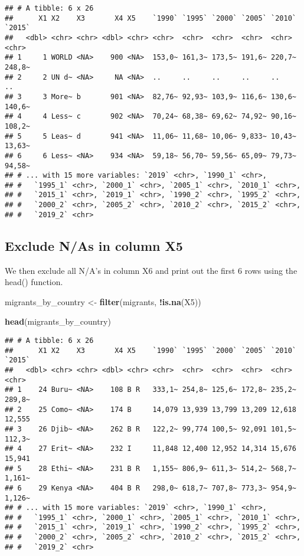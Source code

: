 \documentclass[]{article}
\newenvironment{Shaded}{\begin{snugshade}}{\end{snugshade}}
\newcommand{\KeywordTok}[1]{\textcolor[rgb]{0.13,0.29,0.53}{\textbf{#1}}}
\newcommand{\StringTok}[1]{\textcolor[rgb]{0.31,0.60,0.02}{#1}}
\newcommand{\OperatorTok}[1]{\textcolor[rgb]{0.81,0.36,0.00}{\textbf{#1}}}
\newcommand{\NormalTok}[1]{#1}
\begin{document}
\begin{verbatim}
## # A tibble: 6 x 26
##      X1 X2    X3       X4 X5    `1990` `1995` `2000` `2005` `2010` `2015`
##   <dbl> <chr> <chr> <dbl> <chr> <chr>  <chr>  <chr>  <chr>  <chr>  <chr> 
## 1     1 WORLD <NA>    900 <NA>  153,0~ 161,3~ 173,5~ 191,6~ 220,7~ 248,8~
## 2     2 UN d~ <NA>     NA <NA>  ..     ..     ..     ..     ..     ..    
## 3     3 More~ b       901 <NA>  82,76~ 92,93~ 103,9~ 116,6~ 130,6~ 140,6~
## 4     4 Less~ c       902 <NA>  70,24~ 68,38~ 69,62~ 74,92~ 90,16~ 108,2~
## 5     5 Leas~ d       941 <NA>  11,06~ 11,68~ 10,06~ 9,833~ 10,43~ 13,63~
## 6     6 Less~ <NA>    934 <NA>  59,18~ 56,70~ 59,56~ 65,09~ 79,73~ 94,58~
## # ... with 15 more variables: `2019` <chr>, `1990_1` <chr>,
## #   `1995_1` <chr>, `2000_1` <chr>, `2005_1` <chr>, `2010_1` <chr>,
## #   `2015_1` <chr>, `2019_1` <chr>, `1990_2` <chr>, `1995_2` <chr>,
## #   `2000_2` <chr>, `2005_2` <chr>, `2010_2` <chr>, `2015_2` <chr>,
## #   `2019_2` <chr>
\end{verbatim}

\subsection{Exclude N/As in column X5}\label{exclude-nas-in-column-x5}

We then exclude all N/A's in column X6 and print out the first 6 rows
using the head() function.

\begin{Shaded}
\begin{Highlighting}[]
\NormalTok{migrants_by_country <-}\StringTok{ }\KeywordTok{filter}\NormalTok{(migrants, }\OperatorTok{!}\KeywordTok{is.na}\NormalTok{(X5))}

\KeywordTok{head}\NormalTok{(migrants_by_country)}
\end{Highlighting}
\end{Shaded}

\begin{verbatim}
## # A tibble: 6 x 26
##      X1 X2    X3       X4 X5    `1990` `1995` `2000` `2005` `2010` `2015`
##   <dbl> <chr> <chr> <dbl> <chr> <chr>  <chr>  <chr>  <chr>  <chr>  <chr> 
## 1    24 Buru~ <NA>    108 B R   333,1~ 254,8~ 125,6~ 172,8~ 235,2~ 289,8~
## 2    25 Como~ <NA>    174 B     14,079 13,939 13,799 13,209 12,618 12,555
## 3    26 Djib~ <NA>    262 B R   122,2~ 99,774 100,5~ 92,091 101,5~ 112,3~
## 4    27 Erit~ <NA>    232 I     11,848 12,400 12,952 14,314 15,676 15,941
## 5    28 Ethi~ <NA>    231 B R   1,155~ 806,9~ 611,3~ 514,2~ 568,7~ 1,161~
## 6    29 Kenya <NA>    404 B R   298,0~ 618,7~ 707,8~ 773,3~ 954,9~ 1,126~
## # ... with 15 more variables: `2019` <chr>, `1990_1` <chr>,
## #   `1995_1` <chr>, `2000_1` <chr>, `2005_1` <chr>, `2010_1` <chr>,
## #   `2015_1` <chr>, `2019_1` <chr>, `1990_2` <chr>, `1995_2` <chr>,
## #   `2000_2` <chr>, `2005_2` <chr>, `2010_2` <chr>, `2015_2` <chr>,
## #   `2019_2` <chr>
\end{verbatim}
\end{document}
